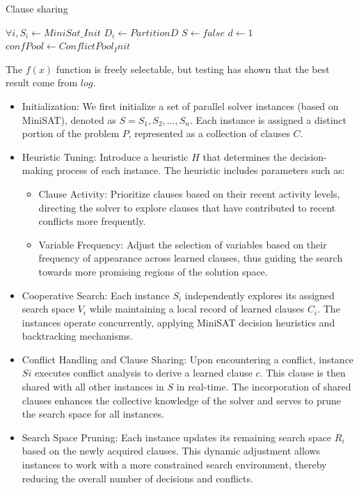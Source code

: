 \documentclass{article}
\begin{document}
\begin{algorithm}
\caption{Clause sharing}\label{alg:cap}
 $\forall i, S_i \gets MiniSat\_Init$ \;
 $D_i \gets Partition D$\;
 $S \gets false$\;
 $d \gets 1$
 $confPool \gets ConflictPool_Init$\;
\end{algorithm}

The $f(x)$ function is freely selectable, but testing has shown that the best result come from $log$.

\begin{itemize}
    \item Initialization: We first initialize a set of parallel solver instances (based on MiniSAT), denoted as $S = {S_1,S_2,…,S_n}$. Each instance is assigned a distinct portion of the problem $P$, represented as a collection of clauses $C$.
    \item Heuristic Tuning: Introduce a heuristic $H$ that determines the decision-making process of each instance. The heuristic includes parameters such as:
    \begin{itemize}
        \item Clause Activity: Prioritize clauses based on their recent activity levels, directing the solver to explore clauses that have contributed to recent conflicts more frequently.
        \item Variable Frequency: Adjust the selection of variables based on their frequency of appearance across learned clauses, thus guiding the search towards more promising regions of the solution space.
    \end{itemize}
    \item Cooperative Search: Each instance $S_i$ independently explores its assigned search space $V_i$ while maintaining a local record of learned clauses $C_i$. The instances operate concurrently, applying MiniSAT decision heuristics and backtracking mechanisms.
    \item Conflict Handling and Clause Sharing: Upon encountering a conflict, instance $Si$ executes conflict analysis to derive a learned clause $c$. This clause is then shared with all other instances in $S$ in real-time.
    The incorporation of shared clauses enhances the collective knowledge of the solver and serves to prune the search space for all instances.
    \item Search Space Pruning: Each instance updates its remaining search space $R_i$ based on the newly acquired clauses. This dynamic adjustment allows instances to work with a more constrained search environment, thereby reducing the overall number of decisions and conflicts.


\end{itemize}
\end{document}
